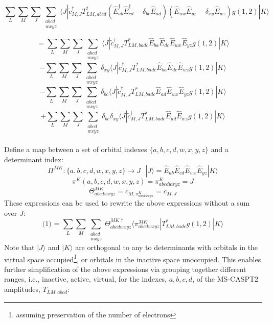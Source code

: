 \documentclass[12pt]{article}
\begin{document}
\begin{equation*}
\sum_{L} \sum_{M}\sum_{J}\sum_{\substack{abcd\\ wxyz}} 
\langle J |\tilde{c}^{\dagger}_{M,J} T^{\dagger}_{LM,abcd}(\hat{E}^{\dagger}_{ab}
\hat{E}^{\dagger}_{cd}-\delta_{bc}\hat{E}_{ad})(\hat{E}_{wx}\hat{E}_{yz}-\delta_{xy}\hat{E}_{wz})g(1,2)|K\rangle
\end{equation*}

\begin{equation}
=\sum_{L} \sum_{M}\sum_{J}\sum_{\substack{abcd\\ wxyz}} 
\langle J |\tilde{c}^{\dagger}_{M,J}T^{*}_{LM,badc}\hat{E}_{ba}\hat{E}_{dc}\hat{E}_{wx}\hat{E}_{yz}g(1,2)|K\rangle
\end{equation}
\begin{equation}
-\sum_{L} \sum_{M}\sum_{J}\sum_{\substack{abcd\\ wxyz}} 
\delta_{xy}\langle J |\tilde{c}^{\dagger}_{M,J}T^{*}_{LM,badc}\hat{E}_{ba}\hat{E}_{dc}\hat{E}_{wz}g(1,2)|K\rangle
\end{equation}
\begin{equation}
-\sum_{L} \sum_{M}\sum_{J}\sum_{\substack{abcd\\ wxyz}} 
\delta_{bc}\langle J |\tilde{c}^{\dagger}_{M,J}T^{*}_{LM,badc}\hat{E}_{ad}\hat{E}_{wx}\hat{E}_{yz}g(1,2)|K\rangle
\end{equation}
\begin{equation}
+\sum_{L} \sum_{M}\sum_{J}\sum_{\substack{abcd\\ wxyz}} 
\delta_{bc}\delta_{xy}\langle J |\tilde{c}^{\dagger}_{M,J}T^{*}_{LM,badc}\hat{E}_{ad}\hat{E}_{wz}g(1,2)|K\rangle
\end{equation}
\\
\noindent Define a map between a set of orbital indexes $\{a,b,c,d,w,x,y,z\}$ and a determinant index:
\begin{equation*}
\Pi^{MK} : \{a,b,c,d,w,x,y,z\} \rightarrow J
 \text{ \ \ \ \ \ \ \ \ \ \ } | J\rangle = \hat{E}_{ab}\hat{E}_{cd}\hat{E}_{wx}\hat{E}_{yz}|K\rangle 
\end{equation*}
\begin{equation*}
\pi^{K} (a,b,c,d,w,x,y,z) =\pi^{K}_{abcdwxyz}= J 
\end{equation*}
\begin{equation*}
\Theta^{MK}_{abcdwxyz} = c_{M,\pi^{K}_{abcdwxyz}} = c_{M,J} 
\end{equation*}
These expressions can be used to rewrite the above expressions without a sum over $J$:
\begin{equation*}
\text{(1) = } \sum_{L} \sum_{M}  \sum_{\substack{abcd\\ wxyz}}\Theta^{MK\dagger}_{abcdwxyz} \langle \pi^{MK}_{abcdwxyz} |T^{*}_{LM,badc}g(1,2)|K\rangle
\end{equation*}
Note that $|J\rangle$ and $|K\rangle$ are orthogonal to
any to determinants with orbitals in the virtual space occupied\footnote{assuming preservation of the number of electrons},
or orbitals in the inactive space unoccupied. This enables further simplification of the above expressions via grouping together
different ranges, i.e., inactive, active, virtual, for the indexes, $a,b,c,d$, of the MS-CASPT2 amplitudes, $T_{LM,abcd}$:\\
\end{document}
